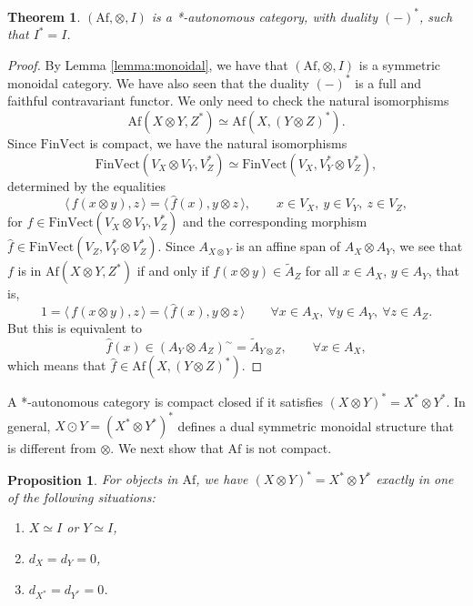 \documentclass[12pt]{article}
\newtheorem{theorem}{Theorem}
\newtheorem{prop}{Proposition}
\theoremstyle{definition}
\theoremstyle{remark}
\def\<{\langle\,}
\def\>{\,\rangle}
\def \Af{\mathrm{Af}}
\def \FV{\mathrm{FinVect}}
\begin{document}
\begin{theorem} $(\Af,\otimes,I)$ is a *-autonomous category, with duality $(-)^*$, such
that $I^*=I$.

\end{theorem}


\begin{proof} By Lemma \ref{lemma:monoidal}, we have that $(\Af,\otimes, I)$ is a symmetric
monoidal category. We have also seen that the duality $(-)^*$ is a full and faithful
contravariant functor. We only need to check the natural isomorphisms 
\[
\Af(X\otimes Y,Z^*)\simeq \Af(X,(Y\otimes Z)^*).
\]
Since $\FV$ is compact, we have the natural isomorphisms
\[
\FV(V_X\otimes V_Y,V^*_Z)\simeq \FV(V_X,V_Y^*\otimes V_Z^*),
\]
determined by the equalities
\[
\<f(x\otimes y),z\>=\<\hat f(x),y\otimes z\>,\qquad x\in V_X,\ y\in V_Y,\ z\in V_Z,
\]
for $f\in \FV(V_X\otimes V_Y,V_Z^*)$ and the corresponding morphism  $\hat f\in \FV(V_Z,V_Y^*\otimes V_Z^*)$. Since
$A_{X\otimes Y}$ is an affine span of $A_X\otimes A_Y$, we see that
$f$ is in $\Af(X\otimes Y, Z^*)$ if and only if $f(x\otimes y)\in \tilde A_Z$ for all $x\in A_X$, $y\in
A_Y$, that is, 
\[
1=\<f(x\otimes y),z\>=\<\hat f(x),y\otimes z\>\qquad \forall x\in A_X,\
\forall y\in A_Y,\ \forall z\in A_Z.
\]
But this is equivalent to
\[
\hat f(x)\in (A_Y\otimes A_Z)^\sim=\tilde A_{Y\otimes Z},\qquad \forall x\in A_X,
\]
which means that $\hat f\in \Af(X, (Y\otimes Z)^*)$.

\end{proof}
A *-autonomous category is compact closed if it satisfies $(X\otimes Y)^*=X^*\otimes
Y^*$. 
In general, $X\odot Y=(X^*\otimes Y^*)^*$ defines a dual symmetric monoidal
structure that is different from $\otimes$. 
We next show that $\Af$ is not compact.

\begin{prop}\label{prop:noncompact} For objects in $\Af$, we have $(X\otimes
Y)^*=X^*\otimes Y^*$ exactly in one of the following situations:
\begin{enumerate}
\item[(i)] $X\simeq I$ or $Y\simeq I$,
\item[(ii)] $d_X=d_Y=0$,
\item[(iii)] $d_{X^*}=d_{Y^*}=0$.
\end{enumerate}



\end{prop}
\end{document}
